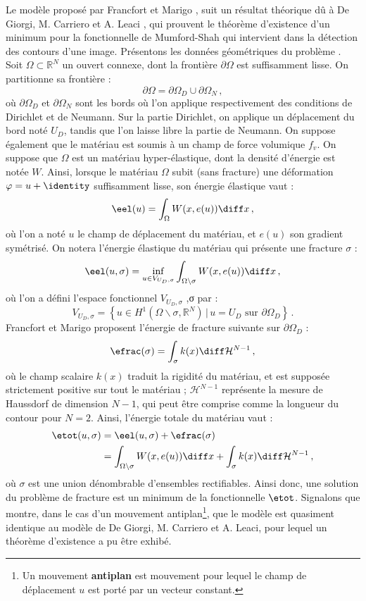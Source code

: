 Le modèle proposé par Francfort et Marigo \parencite{francfort1998revisiting}, suit un résultat théorique dû à De Giorgi, M. Carriero et A. Leaci \parencite{de1989existence}, qui prouvent le théorème d’existence d'un minimum pour la fonctionnelle de Mumford-Shah qui intervient dans la détection des contours d’une image. Présentons les données géométriques du problème \parencite[p.37]{balasoiu2020halthesis}. Soit $\Omega \subset \mathbb{R}^N$ un ouvert connexe, dont la frontière $\partial \Omega$ est suffisamment lisse. On partitionne sa frontière :
$$
\partial \Omega = \partial \Omega_D \cup  \partial \Omega_N \,,
$$
où $\partial \Omega_D$ et $\partial \Omega_N$ sont les bords où l’on applique respectivement des conditions de Dirichlet et de Neumann. Sur la partie Dirichlet, on applique un déplacement du bord noté $U_D$, tandis que l’on laisse libre la partie de Neumann. On suppose également que le matériau est soumis à un champ de force volumique $f_v$. On suppose que $\Omega$ est un matériau hyper-élastique, dont la densité d’énergie est notée $W$. Ainsi, lorsque le matériau $\Omega$ subit (sans fracture) une déformation $\varphi = u + \identity$ suffisamment lisse, son énergie élastique vaut :
$$
\eel(u) = \int_{\Omega} W(x,e(u)) \diff x \,,
$$
où l’on a noté $u$ le champ de déplacement du matériau, et $e(u)$ son gradient symétrisé. On notera l’énergie élastique du matériau qui présente une fracture $\sigma$ :
$$
\eel(u,\sigma) = \inf_{u\in V_{U_D, \sigma}}{\int_{\Omega \backslash \sigma} W(x,e(u)) \diff x} \,,
$$
où l’on a défini l’espace fonctionnel $V_{U_D,\sigma}$ ,σ par :
$$
V_{U_D,\sigma} = \left\{ u \in H^1(\Omega \backslash \sigma, \mathbb{R}^N) \, \rvert \, u = U_D \text{ sur } \partial \Omega_D \right\} \,.
$$
Francfort et Marigo proposent l’énergie de fracture suivante sur $\partial \Omega_D$ :
$$
\efrac(\sigma) = \int_{\sigma} k(x) \diff \mathcal{H}^{N-1} \,,
$$
où le champ scalaire $k(x)$ traduit la rigidité du matériau, et est supposée strictement positive sur tout le matériau ; $\mathcal{H}^{N-1}$ représente la mesure de Haussdorf de dimension $N-1$, qui peut être comprise comme la longueur du contour pour $N=2$.
Ainsi, l’énergie totale du matériau vaut :
\begin{align*}
\etot(u,\sigma) &= \eel(u,\sigma) + \efrac(\sigma) \\
&= \int_{\Omega \backslash \sigma} W(x,e(u)) \diff x + \int_{\sigma} k(x) \diff \mathcal{H}^{N-1} \,,
\end{align*}
où $\sigma$ est une union dénombrable d'ensembles rectifiables. Ainsi donc, une solution du problème de fracture est un minimum de la fonctionnelle $\etot$. Signalons que \citeauthor{balasoiu2020halthesis} montre, dans le cas d'un mouvement antiplan\footnote{Un mouvement \textbf{antiplan} est mouvement pour lequel le champ de déplacement $u$ est porté par un vecteur constant.}, que le modèle est quasiment identique au modèle de De Giorgi, M. Carriero et A. Leaci, pour lequel un théorème d'existence a pu être exhibé.

